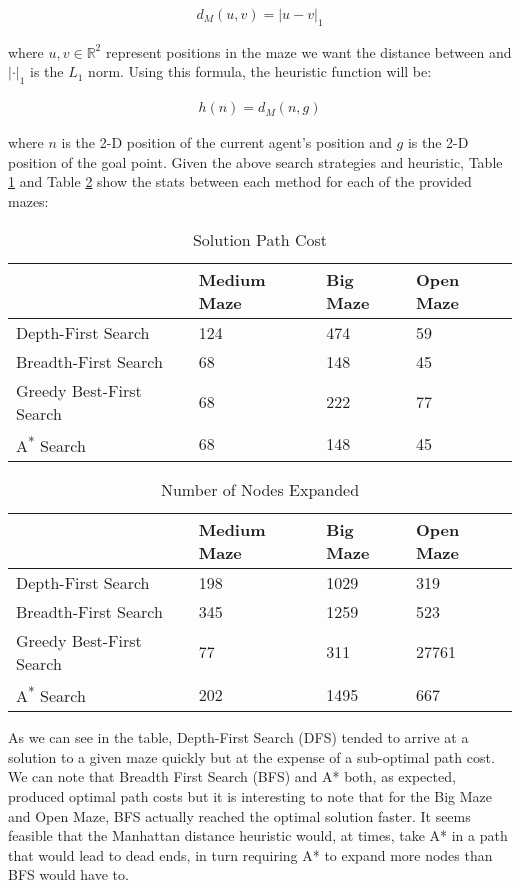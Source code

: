 \documentclass{article}[12pt]
\begin{document}
   \begin{align*}
   d_M(u,v) = |u - v|_1
   \end{align*}
   
   where $u, v \in \mathbb{R}^2$ represent positions in the maze we want the distance between and $|\cdot|_1$ is the $L_1$ norm. Using this formula, the heuristic function will be:
   
   \begin{align*}
   h(n) = d_M(n,g)
\end{align*}      
   
   where $n$ is the 2-D position of the current agent's position and $g$ is the 2-D position of the goal point. Given the above search strategies and heuristic, Table \ref{tab:sol11} and Table \ref{tab:nnode11} show the stats between each method for each of the provided mazes:
   
   \begin{table}[ht]
   \centering
   \begin{tabular}{l | l | l | l  }
   \hline
    & Medium Maze & Big Maze & Open Maze\\
    \hline \hline 
   Depth-First Search & 124 & 474 & 59 \\
   Breadth-First Search & 68 & 148 & 45 \\
   Greedy Best-First Search & 68 & 222 & 77 \\
   A\textsuperscript{*} Search & 68 & 148 & 45 \\
   \hline
   \end{tabular}
   \caption{Solution Path Cost} \label{tab:sol11}
   \end{table}
   
   \begin{table}[ht]
   \centering
   \begin{tabular}{l | l | l | l  }
   \hline
    & Medium Maze & Big Maze & Open Maze\\
    \hline \hline 
   Depth-First Search & 198 & 1029 & 319 \\
   Breadth-First Search & 345 & 1259 & 523 \\
   Greedy Best-First Search & 77 & 311 & 27761 \\
   A\textsuperscript{*} Search & 202 & 1495 & 667 \\
   \hline
   \end{tabular}
   \caption{Number of Nodes Expanded} \label{tab:nnode11}
   \end{table}
   
   As we can see in the table, Depth-First Search (DFS) tended to arrive at a solution to a given maze quickly but at the expense of a sub-optimal path cost. We can note that Breadth First Search (BFS) and A* both, as expected, produced optimal path costs but it is interesting to note that for the Big Maze and Open Maze, BFS actually reached the optimal solution faster. It seems feasible that the Manhattan distance heuristic would, at times, take A* in a path that would lead to dead ends, in turn requiring A* to expand more nodes than BFS would have to. 
   
\end{document}
